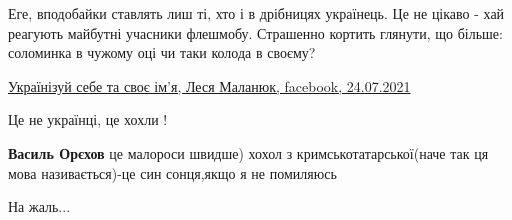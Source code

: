 \begin{itemize}
 
Еге, вподобайки ставлять лиш ті, хто і в дрібницях українець. Це не цікаво - хай реагують майбутні учасники флешмобу. Страшенно кортить глянути, що більше: соломинка в чужому оці чи таки колода в своєму?

 
\href{https://www.facebook.com/groups/326328151119372/permalink/1327806930971484/}{%
Українізуй себе та своє ім'я, Леся Маланюк, facebook, 24.07.2021%
}


 
Це не українці, це хохли !

\begin{itemize}
 
\textbf{Василь Орєхов} це малороси швидше) хохол з кримськотатарської(наче так ця мова називається)-це син сонця,якщо я не помиляюсь
\end{itemize}

 
На жаль...

 

\end{itemize}
